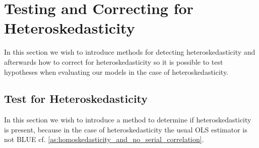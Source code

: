 \section{Testing and Correcting for Heteroskedasticity}
In this section we wish to introduce methods for detecting heteroskedasticity and afterwards how to correct for heteroskedasticity so it is possible to test hypotheses when evaluating our models in the case of heteroskedasticity.

\subsection{Test for Heteroskedasticity}
In this section we wish to introduce a method to determine if heteroskedasticity is present, because in the case of heteroskedasticity the usual OLS estimator is not BLUE cf.$\!$ \ref{as:homoskedasticity_and_no_serial_correlation}. 


